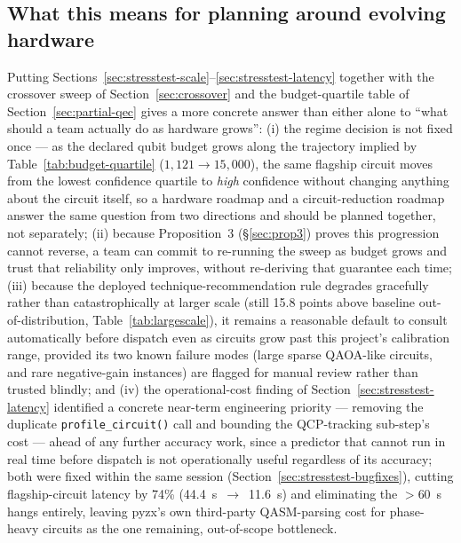 \documentclass[9pt,twocolumn]{extarticle}
\begin{document}
\subsection{What this means for planning around evolving hardware}
\label{sec:stresstest-practical}
Putting Sections~\ref{sec:stresstest-scale}--\ref{sec:stresstest-latency}
together with the crossover sweep of Section~\ref{sec:crossover} and the
budget-quartile table of Section~\ref{sec:partial-qec} gives a more
concrete answer than either alone to ``what should a team actually do as
hardware grows'': (i) the regime decision is not fixed once --- as the
declared qubit budget grows along the trajectory implied by
Table~\ref{tab:budget-quartile} ($1{,}121\to15{,}000$), the same flagship
circuit moves from the lowest confidence quartile to \emph{high}
confidence without changing anything about the circuit itself, so a
hardware roadmap and a circuit-reduction roadmap answer the same question
from two directions and should be planned together, not separately; (ii)
because Proposition~3 (\S\ref{sec:prop3}) proves this progression cannot
reverse, a team can commit to re-running the sweep as budget grows and
trust that reliability only improves, without re-deriving that guarantee
each time; (iii) because the deployed technique-recommendation rule
degrades gracefully rather than catastrophically at larger scale (still
15.8 points above baseline out-of-distribution, Table~\ref{tab:largescale}),
it remains a reasonable default to consult automatically before dispatch
even as circuits grow past this project's calibration range, provided its
two known failure modes (large sparse QAOA-like circuits, and rare
negative-gain instances) are flagged for manual review rather than trusted
blindly; and (iv) the operational-cost finding of
Section~\ref{sec:stresstest-latency} identified a concrete near-term
engineering priority --- removing the duplicate \texttt{profile\_circuit()}
call and bounding the QCP-tracking sub-step's cost --- ahead of any further
accuracy work, since a predictor that cannot run in real time before
dispatch is not operationally useful regardless of its accuracy; both were
fixed within the same session (Section~\ref{sec:stresstest-bugfixes}), cutting
flagship-circuit latency by 74\% (44.4~s~$\to$~11.6~s) and eliminating the
$>$60~s hangs entirely, leaving pyzx's own third-party QASM-parsing cost
for phase-heavy circuits as the one remaining, out-of-scope bottleneck.

\FloatBarrier
\end{document}
